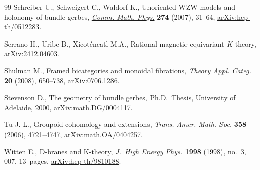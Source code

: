 \begin{thebibliography}{99}
Schreiber U., Schweigert C., Waldorf K., Unoriented {WZW} models and holonomy
 of bundle gerbes,
 \href{https://doi.org/10.1007/s00220-007-0271-x}{\textit{Comm. Math. Phys.}}
 \textbf{274} (2007), 31--64,
 \href{http://arxiv.org/abs/hep-th/0512283}{arXiv:hep-th/0512283}.

Serrano H., Uribe B., Xicot\'encatl M.A., Rational magnetic equivariant
 {$K$}-theory, \href{http://arxiv.org/abs/2412.04603}{arXiv:2412.04603}.

Shulman M., Framed bicategories and monoidal fibrations, \textit{Theory Appl.
 Categ.} \textbf{20} (2008), 650--738,
 \href{http://arxiv.org/abs/0706.1286}{arXiv:0706.1286}.

Stevenson D., The geometry of bundle gerbes, Ph.D.~Thesis, {U}niversity of
 {A}delaide, 2000,
 \href{http://arxiv.org/abs/math.DG/0004117}{arXiv:math.DG/0004117}.

Tu J.-L., Groupoid cohomology and extensions,
 \href{https://doi.org/10.1090/S0002-9947-06-03982-1}{\textit{Trans. Amer.
 Math. Soc.}} \textbf{358} (2006), 4721--4747,
 \href{http://arxiv.org/abs/math.OA/0404257}{arXiv:math.OA/0404257}.

Witten E., D-branes and K-theory,
 \href{https://doi.org/10.1088/1126-6708/2000/03/007}{\textit{J.~High Energy
 Phys.}} \textbf{1998} (1998), no.~3, 007, 13~pages,
 \href{http://arxiv.org/abs/hep-th/9810188}{arXiv:hep-th/9810188}.

\end{thebibliography}
